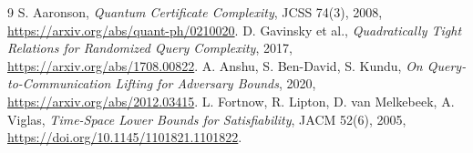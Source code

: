 \documentclass[11pt]{article}
\begin{document}
\begin{thebibliography}{9}
 S. Aaronson, \emph{Quantum Certificate Complexity}, JCSS 74(3), 2008, \url{https://arxiv.org/abs/quant-ph/0210020}.
 D. Gavinsky et al., \emph{Quadratically Tight Relations for Randomized Query Complexity}, 2017, \url{https://arxiv.org/abs/1708.00822}.
 A. Anshu, S. Ben-David, S. Kundu, \emph{On Query-to-Communication Lifting for Adversary Bounds}, 2020, \url{https://arxiv.org/abs/2012.03415}.
 L. Fortnow, R. Lipton, D. van Melkebeek, A. Viglas, \emph{Time-Space Lower Bounds for Satisfiability}, JACM 52(6), 2005, \url{https://doi.org/10.1145/1101821.1101822}.
\end{thebibliography}
\end{document}
